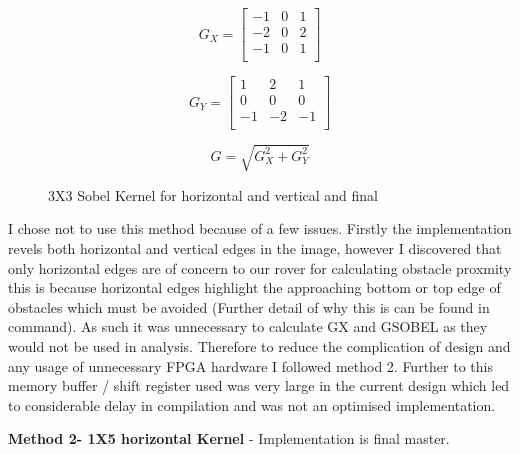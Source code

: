 \documentclass[10pt,twoside]{article}
\begin{document}
\begin{figure}[hbt]
    \begin{minipage}{.33\textwidth}
    \begin{equation}
    G_{X} =
        \begin{bmatrix}
        -1 & 0 & 1 \\ 
        -2 & 0 & 2 \\
        -1 & 0 & 1 \\
    \end{bmatrix}
    \end{equation}
    \end{minipage}
    \begin{minipage}{.33\textwidth}
    \begin{equation}
         G_{Y} =
        \begin{bmatrix}
        1 & 2 & 1 \\ 
        0 & 0 & 0 \\
        -1 & -2 & -1 \\
    \end{bmatrix}
    \end{equation}
    \end{minipage}
     \begin{minipage}{.33\textwidth}
    \begin{equation}
    G = \sqrt{G_{X}^2 + G_{Y}^2}
    \end{equation}
    \end{minipage}
    \caption{3X3 Sobel Kernel for horizontal and vertical and final}
\end{figure}

I chose not to use this method because of a few issues. Firstly the implementation revels both horizontal and vertical edges in the image, however I discovered that only horizontal edges are of concern to our rover for calculating  obstacle proxmity this is because horizontal edges highlight the approaching bottom or top edge of obstacles which must be avoided (Further detail of why this is can be found in command). As such it was unnecessary to calculate GX and GSOBEL as they would not be used in analysis. Therefore to reduce the complication of design and any usage of unnecessary FPGA hardware I followed method 2. Further to this memory buffer / shift register used was very large in the current design which led to considerable delay in compilation and was not an optimised implementation.

\textbf{Method 2- 1X5 horizontal Kernel} - Implementation is final master. 
\end{document}
